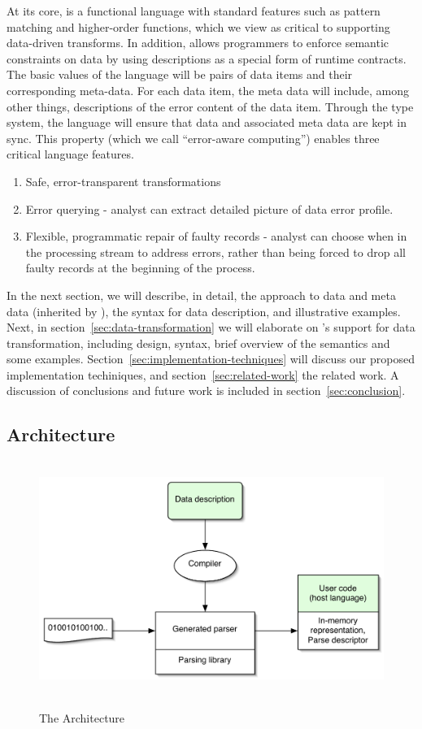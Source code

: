 At its core, \datatype{} is a functional language with standard
features such as pattern matching and higher-order functions, which we
view as critical to supporting data-driven transforms. In addition,
\datatype{} allows programmers to enforce semantic constraints on
data by using \datatype{} descriptions as a special form of runtime
contracts. The basic values of the language will be pairs of data
items and their corresponding meta-data. For each data item, the meta
data will include, among other things, descriptions of the error
content of the data item. Through the type system, the language will
ensure that data and associated meta data are kept in sync. This
property (which we call ``error-aware computing'') enables three
critical language features.
\begin{enumerate}
\item Safe, error-transparent transformations
\item Error querying - analyst can extract detailed picture of data
  error profile.
\item Flexible, programmatic repair of faulty records - analyst can
  choose when in the processing stream to address errors, rather than
  being forced to drop all faulty records at the beginning of the process.
\end{enumerate}

In the next section, we will describe, in detail, the \pads{} approach
to data and meta data (inherited by \datatype{}), the \datatype{}
syntax for data description, and illustrative examples. Next, in
section~\ref{sec:data-transformation} we will elaborate on
\datatype{}'s support for data transformation, including design,
syntax, brief overview of the semantics and some examples.
Section~\ref{sec:implementation-techniques} will discuss our proposed
implementation techiniques, and section~\ref{sec:related-work} the
related work. A discussion of conclusions and future work is included
in section~\ref{sec:conclusion}.


\subsection{Architecture}

\begin{figure}[tp]
  \includegraphics[height=3in,width=5in]{architecture}
\label{fig:pads-arch}
\caption{The \pads{} Architecture}
\end{figure}
